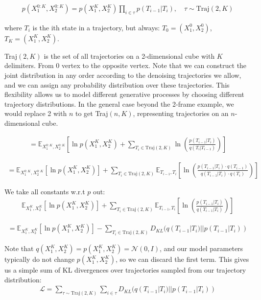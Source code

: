 \documentclass[11pt]{article}
\begin{document}
\begin{align}
p(X_1^{0:K}, X_2^{0:K}) = p(X_1^K, X_2^K) \prod_{i \in \tau} p(T_{i-1} | T_i), \quad \tau \sim \text{Traj}(2,K)
\end{align}

where $T_i$ is the ith state in a trajectory, but always: $T_0 = (X_1^0, X_2^0)$, $T_K = (X_1^K, X_2^K)$.

Traj$(2, K)$ is the set of all trajectories on a 2-dimensional cube with $K$ delimiters. From 0 vertex to the opposite vertex. Note that we can construct the joint distribution in any order according to the denoising trajectories we allow, and we can assign any probability distribution over these trajectories. This flexibility allows us to model different generative processes by choosing different trajectory distributions. In the general case beyond the 2-frame example, we would replace 2 with $n$ to get Traj$(n, K)$, representing trajectories on an $n$-dimensional cube.

\begin{align}
= \mathbb{E}_{X_1^{0:K}, X_2^{0:K}} \left[ \ln p(X_1^K, X_2^K) + \sum_{T_i \in \text{Traj}(2,K)} \ln \left( \frac{p(T_{i-1} | T_i)}{q(T_i | T_{i-1})} \right) \right]
\end{align}

\begin{align}
= \mathbb{E}_{X_1^{0:K}, X_2^{0:K}} \left[ \ln p(X_1^K, X_2^K) \right] + \sum_{T_i \in \text{Traj}(2,K)} \mathbb{E}_{T_{i-1}, T_i} \left[ \ln \left( \frac{p(T_{i-1} | T_i) \cdot q(T_{i-1})}{q(T_{i-1} | T_i) \cdot q(T_i)} \right) \right]
\end{align}

We take all constants w.r.t $p$ out:
\begin{align}
\mathbb{E}_{X_1^K, X_2^K} \left[ \ln p(X_1^K, X_2^K) \right] + \sum_{T_i \in \text{Traj}(2,K)} \mathbb{E}_{T_{i-1}, T_i} \left[ \ln \left( \frac{p(T_{i-1} | T_i)}{q(T_{i-1} | T_i)} \right) \right]
\end{align}

\begin{align}
= \mathbb{E}_{X_1^K, X_2^K} \left[ \ln p(X_1^K, X_2^K) \right] - \sum_{T_i \in \text{Traj}(2,K)} D_{KL}(q(T_{i-1} | T_i) || p(T_{i-1} | T_i))
\end{align}

Note that $q(X_1^K, X_2^K) = p(X_1^K, X_2^K) = \mathcal{N}(0, I)$, and our model parameters typically do not change $p(X_1^K, X_2^K)$, so we can discard the first term. This gives us a simple sum of KL divergences over trajectories sampled from our trajectory distribution:
\begin{align}
\mathcal{L} = \sum_{\tau \sim \text{Traj}(2,K)} \sum_{i \in \tau} D_{KL}(q(T_{i-1} | T_i) || p(T_{i-1} | T_i))
\end{align}
\end{document}
